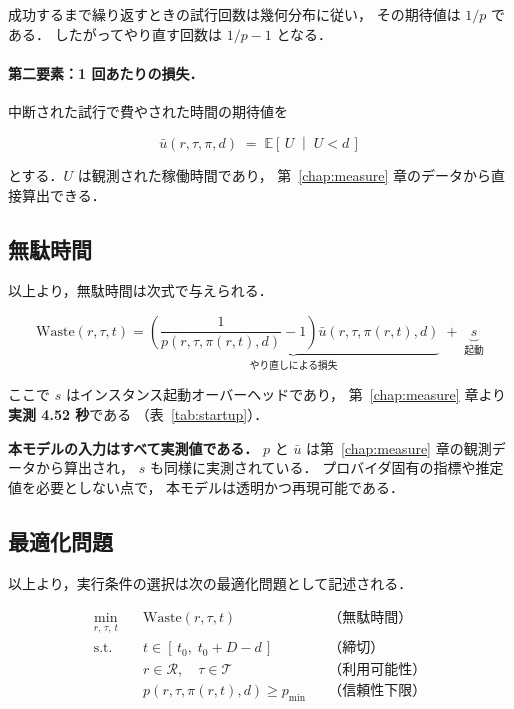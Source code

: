 \documentclass[11pt,a4paper]{ltjsreport}
\newcommand{\E}{\mathbb{E}}
\newcommand{\Waste}{\mathrm{Waste}}
\begin{document}
成功するまで繰り返すときの試行回数は幾何分布に従い，
その期待値は $1/p$ である．
したがってやり直す回数は $1/p - 1$ となる．

\paragraph{第二要素：1 回あたりの損失．}
中断された試行で費やされた時間の期待値を

\begin{equation}
\bar u(r,\tau,\pi,d) \;=\; \E\!\left[\,U \;\middle|\; U < d\,\right]
\label{eq:ubar}
\end{equation}

とする．$U$ は観測された稼働時間であり，
第~\ref{chap:measure} 章のデータから直接算出できる．

\subsection{無駄時間}

以上より，無駄時間は次式で与えられる．

\begin{equation}
\boxed{\;
\Waste(r,\tau,t)
=
\underbrace{\left( \frac{1}{p(r,\tau,\pi(r,t),d)} - 1 \right)
            \bar u(r,\tau,\pi(r,t),d)}_{\text{やり直しによる損失}}
\;+\;
\underbrace{s}_{\text{起動}}
\;}
\label{eq:waste}
\end{equation}

ここで $s$ はインスタンス起動オーバーヘッドであり，
第~\ref{chap:measure} 章より\textbf{実測 4.52 秒}である
（表~\ref{tab:startup}）．

\textbf{本モデルの入力はすべて実測値である．}
$p$ と $\bar u$ は第~\ref{chap:measure} 章の観測データから算出され，
$s$ も同様に実測されている．
プロバイダ固有の指標や推定値を必要としない点で，
本モデルは透明かつ再現可能である．

\subsection{最適化問題}

以上より，実行条件の選択は次の最適化問題として記述される．

\begin{equation}
\begin{aligned}
\min_{r,\,\tau,\,t}\quad
  & \Waste(r,\tau,t) && \text{（無駄時間）} \\[3pt]
\text{s.t.}\quad
  & t \in [\,t_0,\; t_0 + D - d\,] && \text{（締切）} \\[2pt]
  & r \in \mathcal{R},\quad \tau \in \mathcal{T} && \text{（利用可能性）} \\[2pt]
  & p(r,\tau,\pi(r,t),d) \geq p_{\min} && \text{（信頼性下限）}
\end{aligned}
\label{eq:opt}
\end{equation}
\end{document}
